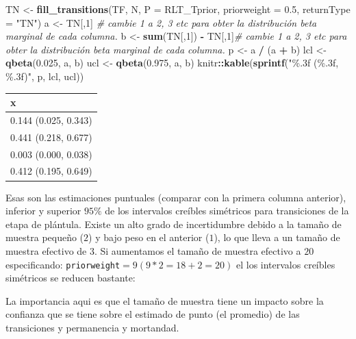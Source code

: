 \documentclass[
]{book}
\newenvironment{Shaded}{\begin{snugshade}}{\end{snugshade}}
\newcommand{\AttributeTok}[1]{\textcolor[rgb]{0.13,0.29,0.53}{#1}}
\newcommand{\CommentTok}[1]{\textcolor[rgb]{0.56,0.35,0.01}{\textit{#1}}}
\newcommand{\DecValTok}[1]{\textcolor[rgb]{0.00,0.00,0.81}{#1}}
\newcommand{\FloatTok}[1]{\textcolor[rgb]{0.00,0.00,0.81}{#1}}
\newcommand{\FunctionTok}[1]{\textcolor[rgb]{0.13,0.29,0.53}{\textbf{#1}}}
\newcommand{\NormalTok}[1]{#1}
\newcommand{\OtherTok}[1]{\textcolor[rgb]{0.56,0.35,0.01}{#1}}
\newcommand{\SpecialCharTok}[1]{\textcolor[rgb]{0.81,0.36,0.00}{\textbf{#1}}}
\newcommand{\StringTok}[1]{\textcolor[rgb]{0.31,0.60,0.02}{#1}}
\theoremstyle{definition}
\theoremstyle{definition}
\theoremstyle{definition}
\theoremstyle{definition}
\theoremstyle{remark}
\begin{document}
\begin{Shaded}
\begin{Highlighting}[]
\NormalTok{TN }\OtherTok{\textless{}{-}} \FunctionTok{fill\_transitions}\NormalTok{(TF, N, }\AttributeTok{P =}\NormalTok{ RLT\_Tprior, }\AttributeTok{priorweight =} \FloatTok{0.5}\NormalTok{, }\AttributeTok{returnType =} \StringTok{"TN"}\NormalTok{)}
\NormalTok{a }\OtherTok{\textless{}{-}}\NormalTok{ TN[,}\DecValTok{1}\NormalTok{] }\CommentTok{\# cambie 1 a 2, 3 etc para obter la distribución beta marginal de cada columna. }
\NormalTok{b }\OtherTok{\textless{}{-}} \FunctionTok{sum}\NormalTok{(TN[,}\DecValTok{1}\NormalTok{]) }\SpecialCharTok{{-}}\NormalTok{ TN[,}\DecValTok{1}\NormalTok{]}\CommentTok{\# cambie 1 a 2, 3 etc para obter la distribución beta marginal de cada columna. }
\NormalTok{p }\OtherTok{\textless{}{-}}\NormalTok{ a }\SpecialCharTok{/}\NormalTok{ (a }\SpecialCharTok{+}\NormalTok{ b)}
\NormalTok{lcl }\OtherTok{\textless{}{-}} \FunctionTok{qbeta}\NormalTok{(}\FloatTok{0.025}\NormalTok{, a, b)}
\NormalTok{ucl }\OtherTok{\textless{}{-}} \FunctionTok{qbeta}\NormalTok{(}\FloatTok{0.975}\NormalTok{, a, b)}
\NormalTok{knitr}\SpecialCharTok{::}\FunctionTok{kable}\NormalTok{(}\FunctionTok{sprintf}\NormalTok{(}\StringTok{"\%.3f (\%.3f, \%.3f)"}\NormalTok{, p, lcl, ucl))}
\end{Highlighting}
\end{Shaded}

\begin{tabular}{l}
\hline
x\\
\hline
0.144 (0.025, 0.343)\\
\hline
0.441 (0.218, 0.677)\\
\hline
0.003 (0.000, 0.038)\\
\hline
0.412 (0.195, 0.649)\\
\hline
\end{tabular}

Esas son las estimaciones puntuales (comparar con la primera columna anterior), inferior
y superior \(95\%\) de los intervalos creíbles simétricos para transiciones de la
etapa de plántula. Existe un alto grado de incertidumbre debido a la
tamaño de muestra pequeño (\(2\)) y bajo peso en el anterior (\(1\)), lo que lleva a
un tamaño de muestra efectivo de 3. Si aumentamos el tamaño de muestra efectivo
a \(20\) especificando: \texttt{priorweight}\(= 9 (9*2 = 18 + 2 = 20)\) el
los intervalos creíbles simétricos se reducen bastante:

La importancia aqui es que el tamaño de muestra tiene un impacto sobre la confianza que se tiene sobre el estimado de punto (el promedio) de las transiciones y permanencia y mortandad.
\end{document}

